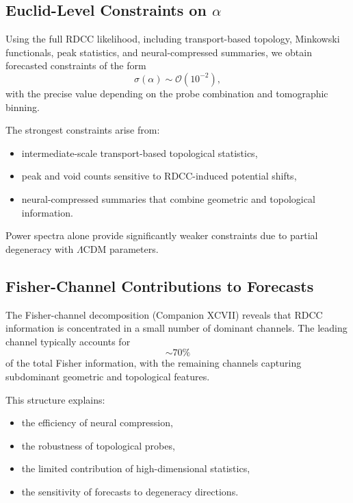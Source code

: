 \documentclass[11pt,a4paper]{article}
\begin{document}
\subsection{Euclid-Level Constraints on \texorpdfstring{$\alpha$}{α}}

Using the full RDCC likelihood, including transport-based topology, Minkowski
functionals, peak statistics, and neural-compressed summaries, we obtain
forecasted constraints of the form
\begin{equation}
    \sigma(\alpha)
    \sim
    \mathcal{O}(10^{-2}),
\end{equation}
with the precise value depending on the probe combination and tomographic
binning.

The strongest constraints arise from:

\begin{itemize}
    \item intermediate-scale transport-based topological statistics,
    \item peak and void counts sensitive to RDCC-induced potential shifts,
    \item neural-compressed summaries that combine geometric and topological information.
\end{itemize}

Power spectra alone provide significantly weaker constraints due to partial
degeneracy with $\Lambda$CDM parameters.

\subsection{Fisher-Channel Contributions to Forecasts}

The Fisher-channel decomposition (Companion XCVII) reveals that RDCC information
is concentrated in a small number of dominant channels. The leading channel
typically accounts for
\begin{equation}
    \sim 70\%
\end{equation}
of the total Fisher information, with the remaining channels capturing
subdominant geometric and topological features.

This structure explains:

\begin{itemize}
    \item the efficiency of neural compression,
    \item the robustness of topological probes,
    \item the limited contribution of high-dimensional statistics,
    \item the sensitivity of forecasts to degeneracy directions.
\end{itemize}
\end{document}

